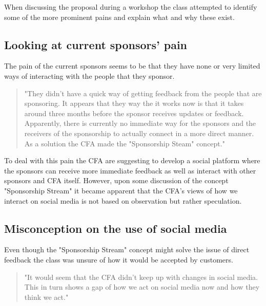 When discussing the proposal during a workshop the class attempted to identify some of the more prominent pains and explain what and why these exist.

\blankpage

\subsection{Looking at current sponsors' pain} %
\label{sub:looking_at_current_sponsors_pain}

The pain of the current sponsors seems to be that they have none or very limited ways of interacting with the people that they sponsor. 

\begin{quote}
"They didn't have a quick way of getting feedback from the people that are sponsoring. It appears that they way the it works now is that it takes around three months before the sponsor receives updates or feedback. Apparently, there is currently no immediate way for the sponsors and the receivers of the sponsorship to actually connect in a more direct manner. As a solution the CFA made the "Sponsorship Steam" concept."
\end{quote}

To deal with this pain the CFA are suggesting to develop a social platform where the sponsors can receive more immediate feedback as well as interact with other sponsors and CFA itself. However, upon some discussion of the concept "Sponsorship Stream" it became apparent that the CFA's views of how we interact on social media is not based on observation but rather speculation.


\subsection{Misconception on the use of social media} %
\label{sub:misconception_on_the_use_of_social_media}

Even though the "Sponsorship Stream" concept might solve the issue of direct feedback the class was unsure of how it would be accepted by customers.

\begin{quote}
"It would seem that the CFA didn't keep up with changes in social media. This in turn shows a gap of how we act on social media now and how they think we act."
\end{quote}

